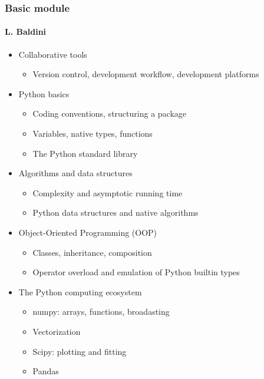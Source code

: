 \documentclass[9pt]{beamer}
\begin{document}
\begin{frame}
  \frametitle{Basic module}
  \framesubtitle{L. Baldini}
  \begin{itemize}
  \item Collaborative tools
    \begin{itemize}
    \item Version control, development workflow, development platforms
    \end{itemize}
  \item Python basics
    \begin{itemize}
    \item Coding conventions, structuring a package
    \item Variables, native types, functions
    \item The Python standard library
    \end{itemize}
  \item Algorithms and data structures
    \begin{itemize}
    \item Complexity and asymptotic running time
    \item Python data structures and native algorithms
    \end{itemize}
  \item Object-Oriented Programming (OOP)
    \begin{itemize}
    \item Classes, inheritance, composition
    \item Operator overload and emulation of Python builtin types
    \end{itemize}
  \item The Python computing ecosystem
    \begin{itemize}
    \item numpy: arrays, functions, broadasting
    \item Vectorization
    \item Scipy: plotting and fitting
    \item Pandas
    \end{itemize}
  \end{itemize}
\end{frame}
\end{document}
